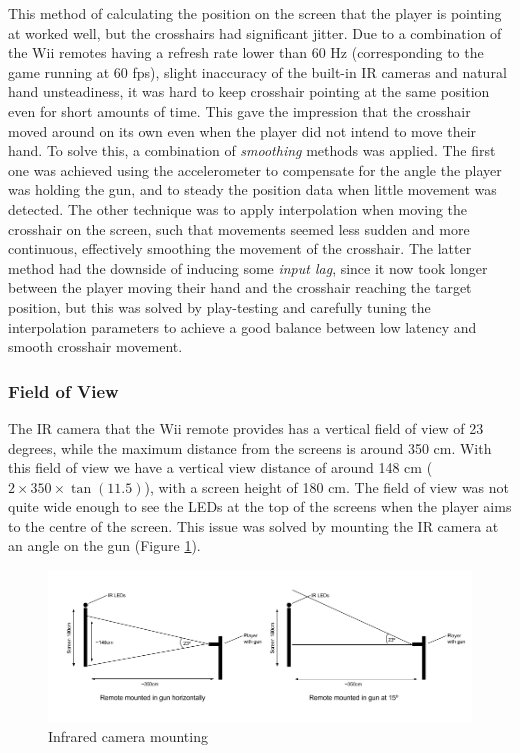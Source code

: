 \documentclass[a4paper,11pt]{article}
\begin{document}
This method of calculating the position on the screen that the player is pointing at worked well, but the crosshairs had significant jitter. Due to a combination of the Wii remotes having a refresh rate lower than 60 Hz (corresponding to the game running at 60 fps), slight inaccuracy of the built-in IR cameras and natural hand unsteadiness, it was hard to keep crosshair pointing at the same position even for short amounts of time. This gave the impression that the crosshair moved around on its own even when the player did not intend to move their hand. To solve this, a combination of \emph{smoothing} methods was applied. The first one was achieved using the accelerometer to compensate for the angle the player was holding the gun, and to steady the position data when little movement was detected. The other technique was to apply interpolation when moving the crosshair on the screen, such that movements seemed less sudden and more continuous, effectively smoothing the movement of the crosshair. The latter method had the downside of inducing some \emph{input lag}, since it now took longer between the player moving their hand and the crosshair reaching the target position, but this was solved by play-testing and carefully tuning the interpolation parameters to achieve a good balance between low latency and smooth crosshair movement.

\subsubsection{Field of View}
The IR camera that the Wii remote provides has a vertical field of view of 23 degrees, while the maximum distance from the screens is around 350 cm. With this field of view we have a vertical view distance of around 148 cm ($2 \times 350 \times \tan(11.5)$), with a screen height of 180 cm. The field of view was not quite wide enough to see the LEDs at the top of the screens when the player aims to the centre of the screen. This issue was solved by mounting the IR camera at an angle on the gun (Figure \ref{fig:ir_mounting}).

\begin{figure}
	\centering
	\includegraphics[scale=0.5]{ir}
    \caption{Infrared camera mounting}
    \label{fig:ir_mounting}
\end{figure}
\end{document}
